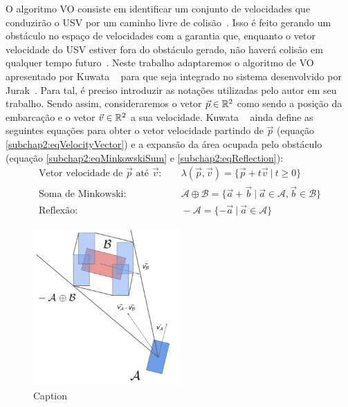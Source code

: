         O algoritmo VO consiste em identificar um conjunto de velocidades que conduzirão o USV por um caminho livre de colisão~\cite{HUANG2019142}. Isso é feito gerando um obstáculo no espaço de velocidades com a garantia que, enquanto o vetor velocidade do USV estiver fora do obstáculo gerado, não haverá colisão em qualquer tempo futuro~\cite{KUWATA2014110}. Neste trabalho adaptaremos o algoritmo de VO apresentado por Kuwata \etal ~\cite{KUWATA2014110} para que seja integrado no sistema desenvolvido por Jurak~\cite{JURAK2020}. Para tal, é preciso introduzir as notações utilizadas pelo autor em seu trabalho. Sendo assim, consideraremos o vetor $\vec{p} \in \mathbb{R}^2$ como sendo a posição da embarcação e o vetor $\vec{v} \in \mathbb{R}^2$ a sua velocidade. Kuwata \etal ~\cite{KUWATA2014110} ainda define as seguintes equações para obter o vetor velocidade partindo de $\vec{p}$ (equação \eqref{subchap2:eqVelocityVector}) e a expansão da área ocupada pelo obstáculo (equação \eqref{subchap2:eqMinkowskiSum} e \eqref{subchap2:eqReflection}):
        \begin{align}
            \text{Vetor velocidade de $\vec{p}$ até $\vec{v}$:}\quad&~\lambda(\vec{p}, \vec{v}) = \{\vec{p} + t\vec{v}~|~t \geq 0\}\label{subchap2:eqVelocityVector}\\
            \text{Soma de Minkowski:}\quad&~\mathcal{A} \oplus \mathcal{B}= \{\vec{a} + \vec{b}~|~\vec{a} \in \mathcal{A}, \vec{b} \in \mathcal{B}\}\label{subchap2:eqMinkowskiSum}\\
            \text{Reflexão:}\quad&~- \mathcal{A}= \{- \vec{a}~|~\vec{a} \in \mathcal{A}\}\label{subchap2:eqReflection}
        \end{align}
        
        \begin{figure}
            \centering
            \includegraphics[width=0.5\textwidth]{fig/chap2/cone_shaped.png}
            \caption{Caption}
            \label{fig:cone_shaped}
        \end{figure}
        

